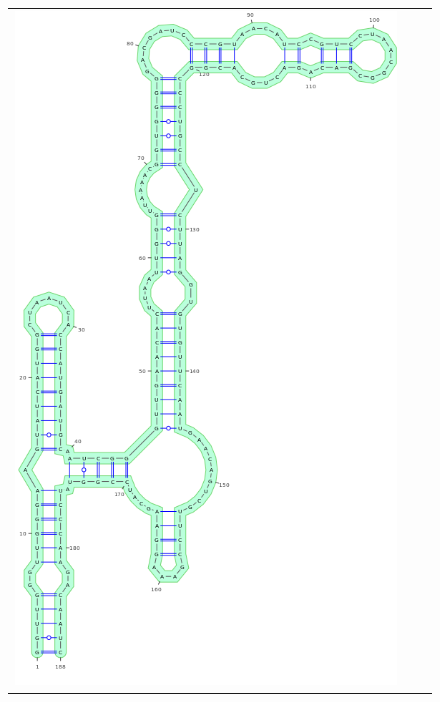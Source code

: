 \documentclass[11pt]{article} %
\begin{document}
{\begin{figure}
{\begin{adjustbox}{max width=\textwidth,max height=\textheight,keepaspectratio}
\begin{tabular}{@{}ccc@{}}
 \includegraphics[scale=\MyScale]{graphs/Supp_structures/1M7CE_NMIACE}

\end{tabular}
\end{adjustbox}}
\end{figure}}
\end{document}
